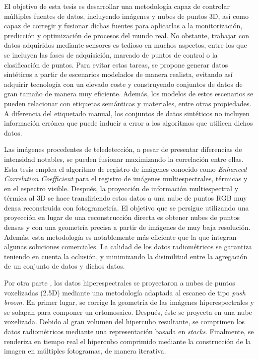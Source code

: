 \newpage
{}

\normalsize
\libertineNormal

El objetivo de esta tesis es desarrollar una metodología capaz de controlar múltiples fuentes de datos, incluyendo imágenes y nubes de puntos 3D, así como capaz de corregir y fusionar dichas fuentes para aplicarlas a la monitorización, predicción y optimización de procesos del mundo real. No obstante, trabajar con datos adquiridos mediante sensores es tedioso en muchos aspectos, entre los que se incluyen las fases de adquisición, marcado de puntos de control o la clasificación de puntos. Para evitar estas tareas, se propone generar datos sintéticos a partir de escenarios modelados de manera realista, evitando así adquirir tecnología con un elevado coste y construyendo conjuntos de datos de gran tamaño de manera muy eficiente. Además, los modelos de estos escenarios se pueden relacionar con etiquetas semánticas y materiales, entre otras propiedades. A diferencia del etiquetado manual, los conjuntos de datos sintéticos no incluyen información errónea que puede inducir a error a los algoritmos que utilicen dichos datos.

Las imágenes procedentes de teledetección, a pesar de presentar diferencias de intensidad notables, se pueden fusionar maximizando la correlación entre ellas. Esta tesis emplea el algoritmo de registro de imágenes conocido como \textit{Enhanced Correlation Coefficient} para el registro de imágenes multiespectrales, térmicas y en el espectro visible. Después, la proyección de información multiespectral y térmica al 3D se hace transfiriendo estos datos a una nube de puntos RGB muy densa reconstruida con fotogrametría. El objetivo que se persigue utilizando una proyección en lugar de una reconstrucción directa es obtener nubes de puntos densas y con una geometría precisa a partir de imágenes de muy baja resolución. Además, esta metodología es notablemente más eficiente que la que integran algunas soluciones comerciales. La calidad de los datos radiométricos se garantiza teniendo en cuenta la oclusión, y minimizando la disimilitud entre la agregación de un conjunto de datos y dichos datos.

Por otra parte , los datos hiperespectrales se proyectaron a nubes de puntos voxelizadas (2.5D) mediante una metodología adaptada al escaneo de tipo \textit{push broom}. En primer lugar, se corrige la geometría de las imágenes hiperespectrales y se solapan para componer un ortomosaico. Después, éste se proyecta en una nube voxelizada. Debido al gran volumen del hipercubo resultante, se comprimen los datos radiométricos mediante una representación basada en \textit{stacks}. Finalmente, se renderiza en tiempo real el hipercubo comprimido mediante la construcción de la imagen en múltiples fotogramas, de manera iterativa.
 

